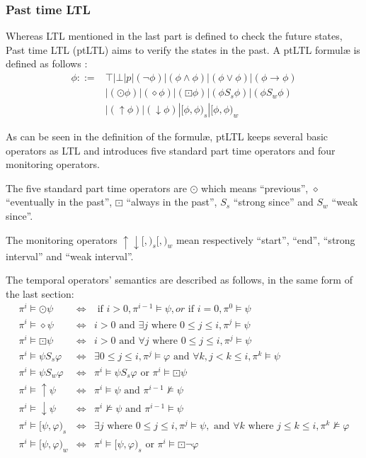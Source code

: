 \subsubsection{Past time LTL}

Whereas LTL mentioned in the last part is defined to check the future states, Past time LTL (ptLTL) aims to verify the states in the past. A ptLTL formul\ae{} is defined as follows \citep{havelund2004efficient}:
\begin{align*}
\phi ::= & \top | \bot | p | (\neg\phi) | (\phi \wedge \phi) | (\phi \vee \phi) | (\phi \rightarrow \phi) \\
& | (\odot \phi) | (\diamond \phi) | (\boxdot \phi) | (\phi \mathrel{S_s} \phi) | (\phi \mathrel{S_w} \phi) \\
& | (\uparrow \phi) | (\downarrow \phi) | [\phi, \phi)_s | [\phi, \phi)_w
\end{align*}

As can be seen in the definition of the formul\ae{}, ptLTL keeps several basic operators as LTL and introduces five standard part time operators and four monitoring operators.

The five standard part time operators are $\odot $ which means ``previous'', $\diamond$ ``eventually in the past'', $\boxdot$ ``always in the past'', $\mathrel{S_s}$ ``strong since'' and $\mathrel{S_w}$ ``weak since''.

The monitoring operators $\uparrow \downarrow [,)_s [,)_w$ mean respectively ``start'', ``end'', ``strong  interval'' and ``weak  interval''.

The temporal operators' semantics are described as follows, in the same form of the last section:
\begin{eqnarray*}
\pi^i \vDash \odot \psi & \iff & \mbox{ if } i > 0, \pi^{i - 1} \vDash \psi, or \mbox{ if } i = 0, \pi^0 \vDash \psi \\
\pi^i \vDash \diamond \psi & \iff & i > 0 \mbox{ and } \exists j \mbox{ where } 0 \leq j \leq i, \pi^j \vDash \psi \\
\pi^i \vDash \boxdot \psi & \iff & i > 0 \mbox{ and } \forall j \mbox{ where } 0 \leq j \leq i, \pi^j \vDash \psi \\
\pi^i \vDash \psi \mathrel{S_s} \varphi & \iff & \exists 0 \leq j \leq i, \pi^j \vDash \varphi \mbox{ and } \forall k, j < k \leq i, \pi^k \vDash \psi \\
\pi^i \vDash \psi \mathrel{S_w} \varphi & \iff & \pi^i \vDash \psi \mathrel{S_s} \varphi \mbox{ or } \pi^i \vDash \boxdot\psi \\
\pi^i \vDash \uparrow \psi & \iff & \pi^i \vDash \psi \mbox{ and } \pi^{i - 1} \nvDash \psi \\
\pi^i \vDash \downarrow \psi & \iff & \pi^i \nvDash \psi \mbox{ and } \pi^{i - 1} \vDash \psi \\
\pi^i \vDash [\psi, \varphi)_s & \iff & \exists j \mbox{ where } 0 \leq j \leq i, \pi^j \vDash \psi, \mbox{ and } \forall k \mbox{ where } j \leq k \leq i, \pi^k \nvDash \varphi \\
\pi^i \vDash [\psi, \varphi)_w & \iff & \pi^i \vDash [\psi, \varphi)_s \mbox{ or } \pi^i \vDash \boxdot\neg\varphi \\
\end{eqnarray*}


